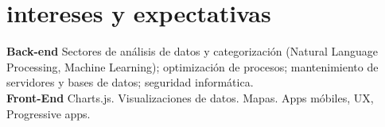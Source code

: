 \documentclass[espanol]{cv-style}     %
\begin{document}
\section{intereses y expectativas}
  \vspace{-0.2cm}
\textbf{Back-end} Sectores de análisis de datos y categorización (Natural Language Processing, Machine Learning); optimización de procesos; mantenimiento de servidores y bases de datos; seguridad informática.\\
\textbf{Front-End} Charts.js. Visualizaciones de datos. Mapas. Apps móbiles, UX, Progressive apps.
\end{document}
